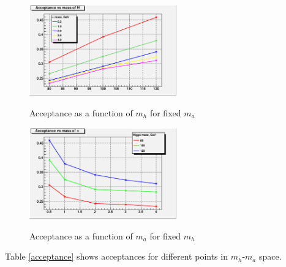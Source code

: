 \documentclass[aps,prd,onecolumn,superscriptaddress,showpacs]{revtex4}
\begin{document}
\begin{figure}[htb]
\begin{center}
\includegraphics[width=15pc]{plots/acceptance_H.eps}
\caption{Acceptance as a function of $m_h$ for fixed $m_a$}
\label{acceptance_H}
\includegraphics[width=15pc]{plots/acceptance_a.eps}
\caption{Acceptance as a function of $m_a$ for fixed $m_h$}
\label{acceptance_a}
\end{center}
\end{figure}



Table \ref{acceptance} shows acceptances for different points in $m_h$-$m_a$ space.
\end{document}
